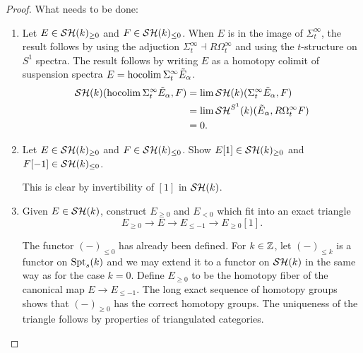 \documentclass{amsart}%
\begin{document}
\begin{proof}
What needs to be done: 
\begin{enumerate}
    \item Let $E \in \mathcal{SH}(k)_{\geq 0}$ and $F \in \mathcal{SH}(k)_{\leq 0}$.
  When $E$ is in the image of $\Sigma^{\infty}_t$, the result follows
  by using the adjuction $\Sigma^{\infty}_t \dashv R\Omega^{\infty}_t$
  and using the $t$-structure on $S^1$ spectra. The result follows by
  writing $E$ as a homotopy colimit of suspension spectra
  $E = \operatorname{hocolim} \Sigma^{\infty}_t \tilde{E}_{\alpha}$. 
  \begin{align*}
    \mathcal{SH}(k)(\operatorname{hocolim} \Sigma^{\infty}_t \tilde{E}_{\alpha}, F) 
    & = \lim \mathcal{SH}(k)(\Sigma^{\infty}_t \tilde{E}_{\alpha}, F)\\
    & = \lim \mathcal{SH}^{S^1}(k)(\tilde{E}_{\alpha}, R\Omega^{\infty}_t F)\\ 
    & = 0.
  \end{align*}

  
    \item Let $E \in \mathcal{SH}(k)_{\geq 0}$ and $F \in \mathcal{SH}(k)_{\leq 0}$.
  Show $E[1] \in \mathcal{SH}(k)_{\geq 0}$ and $F[-1] \in \mathcal{SH}(k)_{\leq 0}$.

  This is clear by invertibility of $[1]$ in $\mathcal{SH}(k)$.

    \item Given $E \in \mathcal{SH}(k)$, construct $E_{\geq 0}$ and $E_{<0}$
  which fit into an exact triangle
  \begin{equation*}
    E_{\geq 0} \to E \to E_{\leq -1} \to E_{\geq 0}[1].
  \end{equation*}

  The functor $(-)_{\leq 0}$ has already been defined. For $k\in\mathbb{Z}$,
  let $(-)_{\leq k}$ is a functor on $\mathrm{Spt}_s(k)$ and we may extend it
  to a functor on $\mathcal{SH}(k)$ in the same way as for the case
  $k=0$. Define $E_{\geq 0}$ to be the homotopy fiber of the canonical
  map $E \to E_{\leq -1}$. The long exact sequence of homotopy groups
  shows that $(-)_{\geq 0}$ has the correct homotopy groups. The
  uniqueness of the triangle follows by properties of triangulated
  categories. 
\end{enumerate}
\end{proof}
\end{document}

